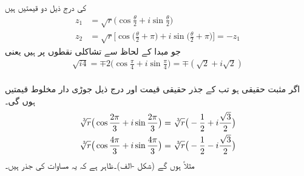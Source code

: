 \quad {}\\
 کی درج ذیل دو قیمتیں ہیں
\begin{align*}
z_1&=\sqrt{r}\big(\cos\frac{\theta}{2}+i\sin\frac{\theta}{2}\big)\\
z_2&=\sqrt{r}\big[\cos\big(\frac{\theta}{2}+\pi\big)+i\sin\big(\frac{\theta}{2}+\pi\big)\big]=-z_1
\end{align*}
جو مبدا کے لحاظ سے تشاکلی نقطوں پر  ہیں یعنی
\begin{align*}
\sqrt{i4}=\mp2\big(\cos \frac{\pi}{4}+i\sin\frac{\pi}{4}\big)=\mp(\sqrt{2}+i\sqrt{2})
\end{align*}
\quad {}\\
اگر  مثبت حقیقی ہو تب  کے جذر حقیقی قیمت  اور درج ذیل جوڑی دار مخلوط قیمتیں ہوں گی۔
\begin{align*}
\sqrt[\leftroot{-2}\uproot{2}3]{r}\big(\cos\frac{2\pi}{3}+i\sin\frac{2\pi}{3}\big)&=\sqrt[\leftroot{-2}\uproot{2}3]{r}\big(-\frac{1}{2}+i\frac{\sqrt{3}}{2}\big)\\
\sqrt[\leftroot{-2}\uproot{2}3]{r}\big(\cos\frac{4\pi}{3}+i\sin\frac{4\pi}{3}\big)&=\sqrt[\leftroot{-2}\uproot{2}3]{r}\big(-\frac{1}{2}-i\frac{\sqrt{3}}{2}\big)
\end{align*}
مثلاً  ہوں گے (شکل -الف)۔ظاہر ہے کہ یہ مساوات  کی جذر ہیں۔
